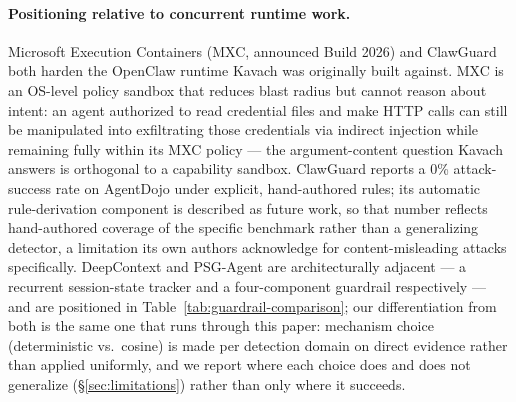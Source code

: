\documentclass[sigconf,anonymous,review]{acmart}
\begin{document}
\paragraph{Positioning relative to concurrent runtime work.} Microsoft
Execution Containers (MXC, announced Build 2026) and ClawGuard
\cite{clawguard2026} both harden the OpenClaw runtime Kavach was originally
built against. MXC is an OS-level policy sandbox that reduces blast radius
but cannot reason about intent: an agent authorized to read credential files
and make HTTP calls can still be manipulated into exfiltrating those
credentials via indirect injection while remaining fully within its MXC
policy --- the argument-content question Kavach answers is orthogonal to a
capability sandbox. ClawGuard reports a 0\% attack-success rate on AgentDojo
under explicit, hand-authored rules; its automatic rule-derivation component
is described as future work, so that number reflects hand-authored coverage
of the specific benchmark rather than a generalizing detector, a limitation
its own authors acknowledge for content-misleading attacks specifically.
DeepContext \cite{albrethsen2026deepcontext} and PSG-Agent \cite{psgagent2026}
are architecturally adjacent --- a recurrent session-state tracker and a
four-component guardrail respectively --- and are positioned in
Table~\ref{tab:guardrail-comparison}; our differentiation from both is the
same one that runs through this paper: mechanism choice (deterministic vs.\
cosine) is made per detection domain on direct evidence rather than applied
uniformly, and we report where each choice does and does not generalize
(\S\ref{sec:limitations}) rather than only where it succeeds.
\end{document}
